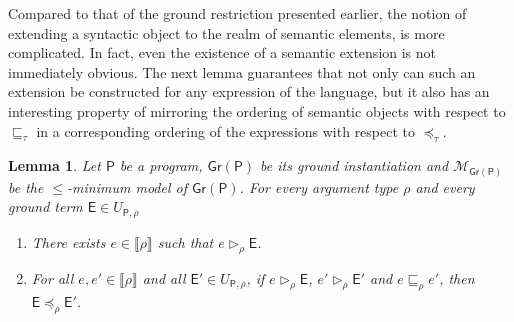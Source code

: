 \documentclass[submission,copyright]{eptcs}
\newtheorem{lemma}{Lemma}
\theoremstyle{definition}
\newcommand{\mo}[1]{\llbracket#1\rrbracket}
\newcommand{\aleq}[1][]{\sqsubseteq_{#1}}
\newcommand{\ee}[1][I]{\rhd_{#1}}
\newcommand{\bezem}{\mathcal{M}_\mathsf{Gr(P)}}
\begin{document}
{Compared to that of the ground restriction presented earlier, the notion of
extending a syntactic object to the realm of semantic elements, is more complicated.
In fact, even the existence of a semantic extension is not immediately obvious.
The next lemma guarantees that not only can such an extension  be constructed
for any expression of the language, but it also has an interesting property of
mirroring the ordering of semantic objects with respect to $\aleq[\tau]$ in a
corresponding ordering of the expressions with respect to $\preceq_\tau$.}
\begin{lemma} \label{lm_order_preservation}
Let $\mathsf{P}$ be a program, $\mathsf{Gr(P)}$ be its ground instantiation and
$\bezem$ be the $\leq$-minimum model of $\mathsf{Gr(P)}$. For every
argument type $\rho$ and every ground term $\mathsf{E} \in U_{\mathsf{P},\rho}$
\begin{enumerate}
\item There exists $e \in \mo{\rho}$ such that $e \ee[\rho] \mathsf{E}$.
\item For all $e, e' \in \mo{\rho}$ and all $\mathsf{E}' \in U_{\mathsf{P},\rho}$, if $e \ee[\rho] \mathsf{E}$, $e' \ee[\rho] \mathsf{E}'$ and $e \aleq[\rho] e'$, then $\mathsf{E} \preceq_\rho \mathsf{E}'$.
\end{enumerate}
\end{lemma}
\end{document}
